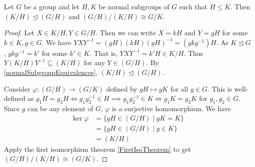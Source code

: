 \begin{theorem}
\label{ThirdIsoTheorem}
    Let $G$ be a group and let $H,K$ be normal subgroups of $G$ such that $H\leq K$. Then $(K/H)\unlhd (G/H)$ and $(G/H)/(K/H)\cong G/K$.
\end{theorem}
\begin{proof}
    Let $X\in K/H, Y\in G/H$. Then we can write $X=kH$ and $Y=gH$ for some $k\in K,g\in G$. We have $YXY^{-1}=(gH)(kH)(gH)^{-1}=(gkg^{-1})H$. As $K\unlhd G$, $gkg^{-1}=k'$ for some $k'\in K$. That is, $YXY^{-1}=k'H\in K/H$. Thus $Y (K/H) Y^{-1}\subseteq (K/H)$ for any $Y\in (G/H)$. By \ref{normalSubgroupEquivalences}, $(K/H)\unlhd (G/H)$.
    
    \vspace{1mm}
    Consider $\varphi:(G/H)\to (G/K)$ defined by $gH\mapsto gK$ for all $g\in G$. This is well-defined as $g_1H=g_2H\iff g_1g_2^{-1}\in H\implies g_1g_2^{-1}\in K\iff g_1K=g_2K$ for $g_1,g_2\in G$. Since $g$ can be any element of $G$, $\varphi$ is a surjective homomorphism. We have
    \begin{align*}
        \ker\varphi &= \{gH\in (G/H)\mid gK=K\} \\
                    &= \{gH\in (G/H)\mid g\in K\} \\
                    &= (K/H)
    \end{align*}
    Apply the first isomorphism theorem \ref{FirstIsoTheorem} to get $(G/H)/(K/H)\cong (G/K)$.
\end{proof}

